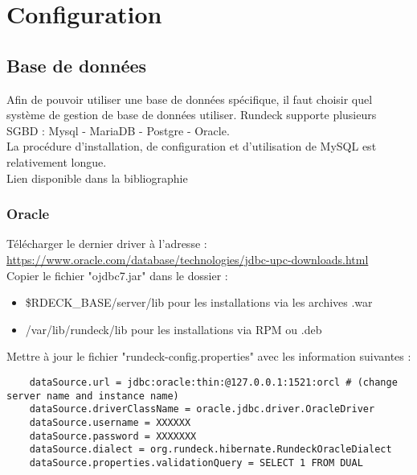 \documentclass[12pt]{article}
\begin{document}
\newpage
\section{Configuration}
\subsection{Base de données}
Afin de pouvoir utiliser une base de données spécifique, il faut choisir quel système de gestion de base de données utiliser. Rundeck supporte plusieurs SGBD : Mysql - MariaDB - Postgre - Oracle.
\\
La procédure d'installation, de configuration et d'utilisation de MySQL est relativement longue.
\\
Lien disponible dans la bibliographie

\subsubsection{Oracle}
Télécharger le dernier driver à l'adresse :
\\ 
\url{https://www.oracle.com/database/technologies/jdbc-upc-downloads.html}
\\
Copier le fichier "ojdbc7.jar" dans le dossier :
\begin{itemize}
    \item \$RDECK\_BASE/server/lib pour les installations via les archives .war
    \item /var/lib/rundeck/lib pour les installations via RPM ou .deb
\end{itemize}
Mettre à jour le fichier "rundeck-config.properties" avec les information suivantes :
\begin{lstlisting}
    dataSource.url = jdbc:oracle:thin:@127.0.0.1:1521:orcl # (change server name and instance name)
    dataSource.driverClassName = oracle.jdbc.driver.OracleDriver
    dataSource.username = XXXXXX
    dataSource.password = XXXXXXX
    dataSource.dialect = org.rundeck.hibernate.RundeckOracleDialect
    dataSource.properties.validationQuery = SELECT 1 FROM DUAL
\end{lstlisting}
\end{document}
